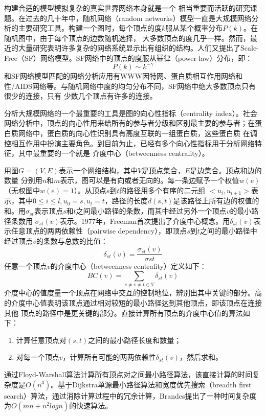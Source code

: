 \begin{flushleft}
构建合适的模型模拟复杂的真实世界网络本身就是一个
相当重要而活跃的研究课题\citep{network-model-nas, network-model-globcomm,network-model-rmat}。在过去的几十年中，随机网络（random
networks）\citep{network-model-nas}模型一直是大规模网络分析的主要研究工具。构建一个图时，每个顶点的度$k$服从某个概率分布$P(k)$。在随机图中，由于每个顶点的边数随机选择，
大多数顶点的度几乎一样。然而，最近的大量研究表明许多复杂的网络系统显示出有组织的结构。人们又提出了Scale-Free（SF）网络模型\citep{network-sf-math,network-sf-phy}。SF网络中的顶点的度服从幂律（power-law）分布\citep{network-power-law}，即：
\begin{equation}\label{eq:power_law}
P(k)\sim k^{-\gamma}
\end{equation}
和SF网络模型匹配的网络分析应用有WWW因特网、蛋白质相互作用网络和性/AIDS网络等。与随机网络中度的均匀分布不同，SF网络中绝大多数顶点只有很少的连接，只有
少数几个顶点有许多的连接。

分析大规模网络的一个最重要的工具是图的向心性指标（centrality
index）\citep{network-centrality}。社会网络分析中，顶点的向心性用来给所有的参与者分级和区别最主要的参与者；在蛋白质网络中，蛋白质的向心性识别具有高度互联的一组蛋白质，这些蛋白质
在调控相互作用中扮演主要角色。到目前为止，已经有多个向心性指标用于分析网络特征，其中最重要的一个就是
介度中心（betweenness centrality）\citep{network-bc}。

用图$G=(V,E)$表示一个网络结构，其中$V$是顶点集合，$E$是边集合。顶点和边的数量
分别用$n$和$m$表示，图可以是有向或者无向的。每一条边赋予一个权值$w(e)$（无权图中$w(e)=1$）。从顶点$s$到$t$的路径用多个有序的二元组
$<u_{i},u_{i+1}>$表示，其中$0\le i\le l, u_{0}=s, u_{t} =
t$，路径的长度$d(s,t)$是该路径上所有边的权值的和。用$\sigma_{st}$表示顶点$s$和$t$之间最小路径的条数，而其中经过另外一个顶点$v$的最小路径条数用
$\sigma_{st}(v)$表示。1977年，Freeman\citep{network-bc}首次提出了介度中心概念。用$\delta_{st}(v)$表示任意顶点的两两依赖性（pairwise
dependency），即顶点$s$到$t$之间的最小路径中经过顶点$v$的条数与总数的比值：
\begin{equation}\label{eq:pairwise_dep}
\delta_{st}(v)=\frac{\sigma_{st}(v)}{\sigma{st}}
\end{equation}
任意一个顶点$v$的介度中心（betweenness centrality）定义如下：
\begin{equation}\label{eq:bet_cent}
BC(v)=\sum_{s\ne v\ne t\in V}\delta_{st}(v)
\end{equation}
介度中心的值度量一个顶点在网络中交互的控制地位，辨别出其中关键的部分。高的介度中心值表明该顶点通过相对较短的最小路径达到其他顶点，即该顶点在连接其他
顶点的路径中是更关键的部分。直接计算所有顶点的介度中心值的算法如下：
\begin{enumerate}
	\item 计算任意顶点对$(s,t)$之间的最小路径长度和数量；
	\item 对每一个顶点$v$，计算所有可能的两两依赖性$\delta_{st}(v)$，然后求和。
\end{enumerate}
通过Floyd-Warshall算法计算所有顶点对之间最小路径算法，该直接计算的时间复杂度是$O(n^{3})$。基于Dijkstra单源最小路径算法和宽度优先搜索（breadth
first search）算法，通过消除计算过程中的冗余计算，Brandes\citep{brandes-bc}提出了一种时间复杂度为$O(mn+n^{2}logn)$的快速算法。


\end{flushleft}
